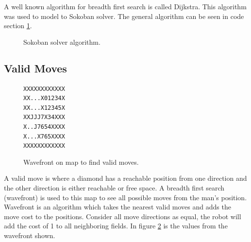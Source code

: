 A well known algorithm for breadth first search is called Dijkstra.
This algorithm was used to model to Sokoban solver.
The general algorithm can be seen in code section \ref{code:sokoban_solver}.

\begin{figure}[h]
\renewcommand\figurename{Code Section}
\centering
{}
 \caption{Sokoban solver algorithm.}
 \label{code:sokoban_solver}
\end{figure}

\subsection{Valid Moves}
\begin{figure}
 \centering
 \begin{minipage}{0.1\textwidth}
\begin{verbatim}
XXXXXXXXXXXX
XX...X01234X
XX...X12345X
XXJJJ7X34XXX
X..J7654XXXX
X...X765XXXX
XXXXXXXXXXXX
\end{verbatim}
 \end{minipage}
 \caption{Wavefront on map to find valid moves.}
 \label{fig:wavefront}
\end{figure}

A valid move is where a diamond has a reachable position from one direction and the other direction is either reachable or free space.
A breadth first search (wavefront) is used to this map to see all possible moves from the man's position.
Wavefront is an algorithm which takes the nearest valid moves and adds the move cost to the positions.
Consider all move directions as equal, the robot will add the cost of 1 to all neighboring fields.
In figure \ref{fig:wavefront} is the values from the wavefront shown.

\clearpage
